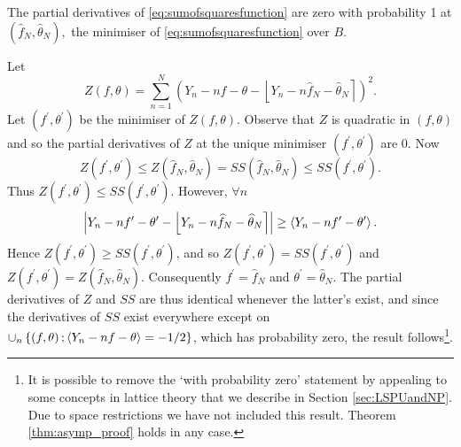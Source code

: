 \documentclass[journal]{IEEEtran}
\begin{document}
\begin{lemma}
\label{lem:part}The partial derivatives of \eqref{eq:sumofsquaresfunction} are
zero with probability 1 at $\left(  \widehat{f}_{N},\widehat{\theta}_{N}\right)  ,$ the minimiser
of \eqref{eq:sumofsquaresfunction} over $B$.
\end{lemma}

\begin{IEEEproof}
Let
\[
Z\left(  f,\theta\right)  =\sum_{n=1}^{N}\left(  Y_{n}-nf-\theta-\left\lfloor
Y_{n}-n\widehat{f}_{N}-\widehat{\theta}_{N}\right\rceil \right)  ^{2}.
\]
Let $\left(  f^{\prime},\theta^{\prime}\right)  $ be the minimiser of
$Z\left(  f,\theta\right)$. Observe that $Z$ is quadratic in
$\left( f,\theta \right)$ and so the partial derivatives of $Z$ at the unique minimiser 
$\left(  f^{\prime},\theta^{\prime}\right)$ are $0$. Now%
\[
Z\left(  f^{\prime},\theta^{\prime}\right)  \leq Z\left(  \widehat{f}%
_{N},\widehat{\theta}_{N}\right)  =SS\left(  \widehat{f}_{N},\widehat{\theta
}_{N}\right)  \leq SS\left(  f^{\prime},\theta^{\prime}\right)  .
\]
Thus $Z\left(  f^{\prime},\theta^{\prime}\right)  \leq SS\left(  f^{\prime}%
,\theta^{\prime}\right)$. However, $\forall n$
\[
\left\vert Y_{n}-nf^{\prime}-\theta^{\prime}-{\left\lfloor  Y_{n}-n\widehat
{f}_{N}-\widehat{\theta}_{N}  \right\rceil} \right\vert \geq\left< 
Y_{n}-nf^{\prime}-\theta^{\prime}  \right>  .
\]
Hence $Z\left(  f^{\prime},\theta^{\prime}\right)  \geq SS\left(  f^{\prime},\theta^{\prime}\right)$, and so $Z\left(  f^{\prime},\theta^{\prime}\right)  =SS\left(  f^{\prime},\theta^{\prime}\right)$ and $Z\left(  f^{\prime},\theta^{\prime}\right)  =Z\left(  \widehat{f}_{N},\widehat{\theta}_{N}\right)$. Consequently $f^{\prime}=\widehat{f}_{N}$ and $\theta^{\prime}=\widehat{\theta}_{N}.$ The partial derivatives of $Z$ and $SS$ are thus identical whenever the latter's exist, and since the derivatives of $SS$ exist everywhere except on $\cup_{n}\left\{  \left(  f,\theta\right)  ; \left<   Y_{n}-nf-\theta  \right> =-1/2\right\}$, which has probability zero, the result follows\footnote{It is possible to remove the `with probability zero' statement by appealing to some concepts in lattice theory that we describe in Section \ref{sec:LSPUandNP}.  Due to space restrictions we have not included this result.  Theorem \ref{thm:asymp_proof} holds in any case.}.
\end{IEEEproof}
\end{document}

